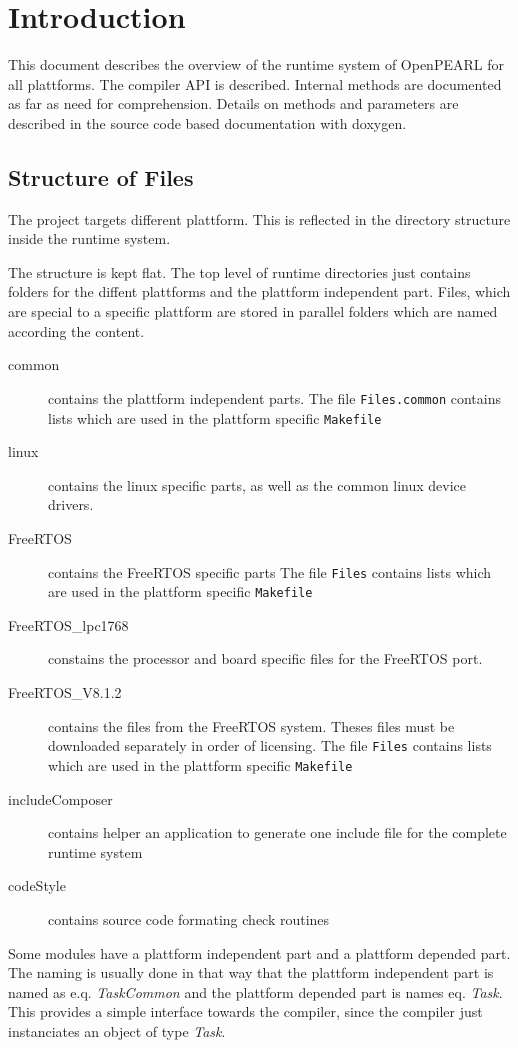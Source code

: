 \chapter{Introduction}

This document describes the overview of the runtime system
of OpenPEARL for all plattforms.
The compiler API is described.
Internal methods are documented as far as need for comprehension.
Details on methods and parameters are 
described in the source code based documentation with doxygen.

\section{Structure of Files}
The project targets different plattform. 
This is reflected in the directory structure inside the runtime system.

The structure is kept flat. The top level of runtime directories
just contains folders for the diffent plattforms and the plattform
independent part. Files, which are special to a specific plattform
are stored in parallel folders which are named according the content.
\begin{description}
\item[common] contains the plattform independent parts.
   The file \verb|Files.common| contains lists which are used in the
  plattform specific  \verb|Makefile|
\item[linux] contains the linux specific parts, as well as the common
   linux device drivers. 
\item[FreeRTOS] contains the FreeRTOS specific parts
   The file \verb|Files| contains lists which are used in the
  plattform specific  \verb|Makefile|
\item[FreeRTOS\_lpc1768] constains the processor and board specific
   files for the FreeRTOS port.
\item[FreeRTOS\_V8.1.2] contains the files from the FreeRTOS system.
  Theses files must be downloaded separately in order of licensing.
   The file \verb|Files| contains lists which are used in the
  plattform specific  \verb|Makefile|
\item[includeComposer] contains helper an application to generate 
   one include file for the complete runtime system
\item[codeStyle] contains source code formating check routines
\end{description}

Some modules have a plattform independent part and a plattform
depended part. The naming is usually done in that way that the 
plattform independent part is named as e.q. {\em TaskCommon} and the 
plattform depended part is names eq. {\em Task}. This provides a simple
interface towards the compiler, since the compiler just instanciates
an object of type {\em Task}.

